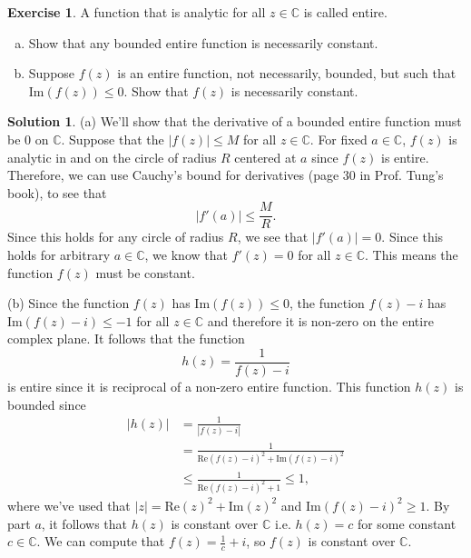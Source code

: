 \documentclass[12pt]{article}
\newcommand{\bbC}{\mathbb{C}}
\newcommand{\abs}[1]{ \left| #1 \right| }
\renewcommand{\Im}{\text{Im}}
\renewcommand{\Re}{\text{Re}}
\theoremstyle{definition}
\newtheorem{exer}{Exercise}
\newtheorem{sol}{Solution}
\theoremstyle{remark}
\begin{document}
\newpage

\begin{exer}
    A function that is analytic for all $z\in\bbC$ is called entire. 

    \begin{enumerate}[(a)]
        \item Show that any bounded entire function is necessarily constant.
        \item Suppose $f(z)$ is an entire function, not necessarily, bounded, but such that $\Im(f(z))\leq 0$. Show that $f(z)$ is necessarily constant.
    \end{enumerate}
\end{exer}

\begin{sol}
    (a) We'll show that the derivative of a bounded entire function must be 0 on $\bbC$. Suppose that the $\abs{f(z)}\leq M$ for all $z\in\bbC$. For fixed $a\in \bbC$, $f(z)$ is analytic in and on the circle of radius $R$ centered at $a$ since $f(z)$ is entire. Therefore, we can use Cauchy's bound for derivatives (page 30 in Prof. Tung's book), to see that
    \begin{equation}
        \abs{f'(a)} \leq \frac{M}{R}. 
    \end{equation}
    Since this holds for any circle of radius $R$, we see that $\abs{f'(a)} = 0$. Since this holds for arbitrary $a\in\bbC$, we know that $f'(z) = 0$ for all $z\in\bbC$. This means the function $f(z)$ must be constant.
    \newpage


    (b) Since the function $f(z)$ has $\Im( f(z)) \leq 0$, the function $f(z)-i$ has $\Im(f(z)-i) \leq -1$ for all $z\in\bbC$ and therefore it is non-zero on the entire complex plane. It follows that the function 
   \begin{equation}
       h(z) = \frac{1}{f(z)-i} 
   \end{equation} 
   is entire since it is reciprocal of a non-zero entire function. This function $h(z)$ is bounded since
   \begin{align}
       \abs{h(z)} &= \frac{1}{\abs{f(z)-i}}\\
                  &= \frac{1}{\Re(f(z) -i)^2 + \Im(f(z) - i)^2 }\\
        &\leq \frac{1}{\Re(f(z)-i)^2 + 1} \leq 1,
   \end{align}
   where we've used that $\abs{z} = \Re(z)^2 + \Im(z)^2$ and $ \Im(f(z)-i)^2 \geq 1$. By part $a$, it follows that $h(z)$ is constant over $\bbC$ i.e. $h(z) = c$ for some constant $c\in\bbC$. We can compute that $f(z) = \frac{1}{c} + i$, so $f(z)$ is constant over $\bbC$.
\end{sol}
\end{document}
